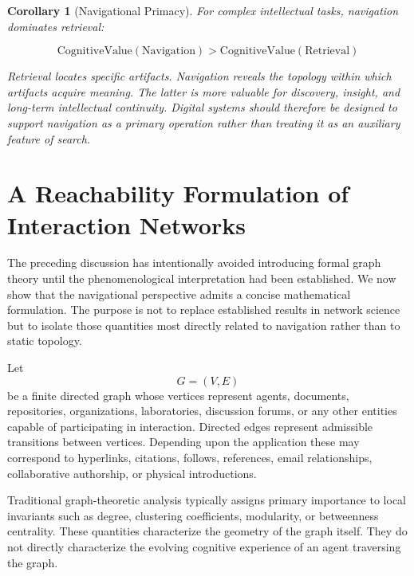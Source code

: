 \documentclass[12pt,oneside]{article}
\newtheorem{corollary}[definition]{Corollary}
\theoremstyle{remark}
\begin{document}
\begin{corollary}[Navigational Primacy]
For complex intellectual tasks, navigation dominates retrieval:

\begin{equation}
\text{CognitiveValue}(\text{Navigation}) > \text{CognitiveValue}(\text{Retrieval})
\end{equation}

Retrieval locates specific artifacts. Navigation reveals the topology within which artifacts acquire meaning. The latter is more valuable for discovery, insight, and long-term intellectual continuity. Digital systems should therefore be designed to support navigation as a primary operation rather than treating it as an auxiliary feature of search.
\end{corollary}


\section{A Reachability Formulation of Interaction Networks}

The preceding discussion has intentionally avoided introducing formal graph theory until the phenomenological interpretation had been established. We now show that the navigational perspective admits a concise mathematical formulation. The purpose is not to replace established results in network science but to isolate those quantities most directly related to navigation rather than to static topology.

Let
\[
G=(V,E)
\]
be a finite directed graph whose vertices represent agents, documents, repositories, organizations, laboratories, discussion forums, or any other entities capable of participating in interaction. Directed edges represent admissible transitions between vertices. Depending upon the application these may correspond to hyperlinks, citations, follows, references, email relationships, collaborative authorship, or physical introductions.

Traditional graph-theoretic analysis typically assigns primary importance to local invariants such as degree, clustering coefficients, modularity, or betweenness centrality. These quantities characterize the geometry of the graph itself. They do not directly characterize the evolving cognitive experience of an agent traversing the graph.
\end{document}
